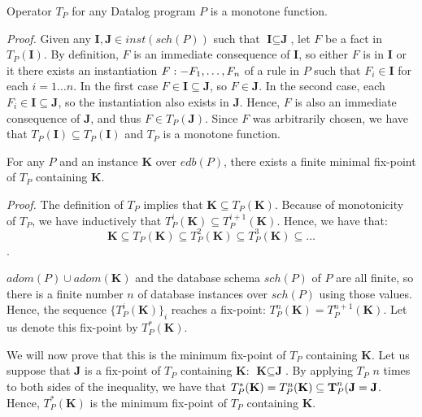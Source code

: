 \begin{lem}
Operator $T_P$ for any Datalog program $P$ is a monotone function.
\end{lem}
\emph{Proof.} Given any $\textbf{I}, \textbf{J} \in inst(sch(P))$ such that $\textbf{I} \subseteq \textbf{J}$, let $F$ be a fact in $T_P(\textbf{I})$.
By definition, $F$ is an immediate consequence of $\textbf{I}$, so either $F$ is in $\textbf{I}$ or it there exists an instantiation
 $F :- F_1, \dots, F_n$ of a rule in $P$ such that $F_i \in \textbf{I}$ for each $i = 1\dots n$. 
In the first case $F \in \textbf{I} \subseteq \textbf{J}$, so $F \in \textbf{J}$. 
In the second case, each $F_i \in \textbf{I} \subseteq \textbf{J}$, so the instantiation also exists in $\textbf{J}$. 
Hence, $F$ is also an immediate consequence of $\textbf{J}$, and thus $F \in T_P(\textbf{J})$. 
Since $F$ was arbitrarily chosen, we have that $T_P(\textbf{I}) \subseteq T_P(\textbf{I})$ and $T_P$ is a monotone function.

\begin{thm}
For any $P$ and an instance $\textbf{K}$ over $edb(P)$, there exists a finite minimal fix-point of $T_P$ containing $\textbf{K}$.
\end{thm}\label{t:datalogfixpointsem}
\emph{Proof.}
The definition of $T_P$ implies that $\textbf{K} \subseteq T_P(\textbf{K})$.
Because of monotonicity of $T_P$, we have inductively that $T_P^i(\textbf{K}) \subseteq T_P^{i+1}(\textbf{K})$.
Hence, we have that:
$$\textbf{K} \subseteq T_P(\textbf{K}) \subseteq T_P^2(\textbf{K}) \subseteq T_P^3(\textbf{K}) \subseteq \dots$$.

$adom(P) \cup adom(\textbf{K})$ and the database schema $sch(P)$ of $P$ are all finite, so there is a finite number $n$ of database instances over $sch(P)$ using those values. Hence, the sequence $\{T_P^i(\textbf{K})\}_i$ reaches a fix-point: $T_P^n(\textbf{K}) = T_P^{n+1}(\textbf{K})$. Let us denote this fix-point by $T_P^*(\textbf{K})$.

We will now prove that this is the minimum fix-point of $T_P$ containing $\textbf{K}$. Let us suppose that $\textbf{J}$ is a fix-point of $T_P$ containing  $\textbf{K}$:  $\textbf{K} \subseteq \textbf{J}$. By applying $T_P$ $n$ times to both sides of the inequality, we have that $T_P^*(\textbf{K}) = T_P^n(\textbf{K}) \subseteq \textbf T_P^n(\textbf{J} = \textbf{J}$. Hence, $T_P^*(\textbf{K})$ is the minimum fix-point of $T_P$ containing $\textbf{K}$.


